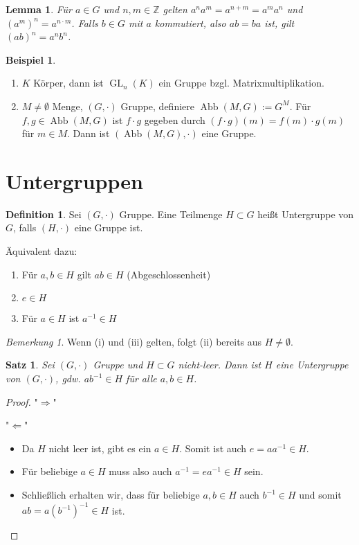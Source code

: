 \documentclass[12pt]{scrartcl} %
\DeclareMathOperator{\GL}{GL}
\DeclareMathOperator{\abb}{Abb}
\newcommand{\Inv}[1]{#1^{-1}}
\newtheorem{thm}{Satz}
\newtheorem{lemma}{Lemma}
\theoremstyle{definition}
\newtheorem*{defn}{Definition}
\newtheorem{ex}{Beispiel}
\theoremstyle{remark}
\newtheorem*{nb}{Bemerkung}
\begin{document}
\begin{lemma}
	Für $a\in G$ und \(n, m \in\mathbb Z\) gelten $a^n a^m=a^{n+m}=a^m a^n$ und $\left(a^m \right)^n = a^{n\cdot m}$.
	Falls \(b \in G\) mit \(a\) kommutiert, also $ab=ba$ ist, gilt $\left(ab \right)^n = a^n b^n$.
\end{lemma}

\begin{ex}
	\begin{enumerate}
	\item $K$ Körper, dann ist $\GL_n(K)$ ein Gruppe bzgl. Matrixmultiplikation.
	\item $M\neq \emptyset$ Menge, $(G, \cdot)$ Gruppe, definiere $\abb(M,G):=G^M$.
		Für $f,g\in \abb(M,G)$ ist $f\cdot g$ gegeben durch $(f\cdot g)(m)=f(m)\cdot g(m)$ für $m\in M$.
		Dann ist $(\abb(M,G), \cdot)$ eine Gruppe.
	\end{enumerate}
\end{ex}

\section{Untergruppen}

\begin{defn}
	Sei $(G, \cdot)$ Gruppe.
	Eine Teilmenge $H\subset G$ heißt Untergruppe von $G$, falls $(H, \cdot)$ eine Gruppe ist.

	Äquivalent dazu:
	\begin{enumerate}[label=(\roman*)]
	\item Für $a,b\in H$ gilt $ab\in H$ (Abgeschlossenheit)
	\item $e\in H$
	\item Für $a\in H$ ist $\Inv a \in H$
	\end{enumerate}
\end{defn}

\begin{nb}
	Wenn (i) und (iii) gelten, folgt (ii) bereits aus \(H \neq \emptyset\).
\end{nb}

\begin{thm}
	Sei $(G, \cdot)$ Gruppe und $H\subset G$ nicht-leer.
	Dann ist $H$ eine Untergruppe von $(G, \cdot)$, gdw. $a\Inv b\in H$ für alle $a,b\in H$.
\end{thm}

\begin{proof}
	"$\Rightarrow$" \checkmark

	"$\Leftarrow$"
	\begin{itemize}
	\item Da \(H\) nicht leer ist, gibt es ein \(a \in H\).
		Somit ist auch $e = aa^{-1}\in H$.
	\item Für beliebige \(a \in H\) muss also auch \(a^{-1} = ea^{-1} \in H\) sein.
	\item Schließlich erhalten wir, dass für beliebige \(a, b \in H\) auch \(b^{-1} \in H\) und somit \(ab = a(b^{-1})^{-1} \in H\) ist. \qedhere
	\end{itemize}
\end{proof}
\end{document}
